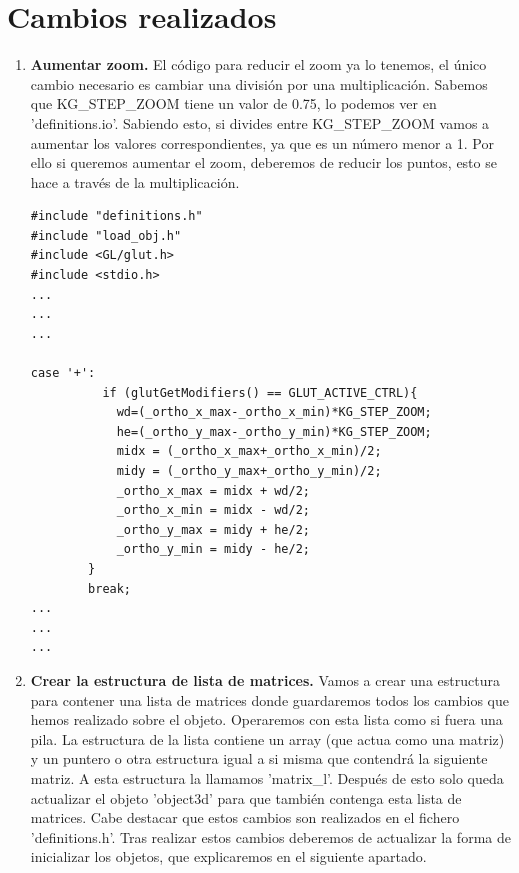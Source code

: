\documentclass[12pt,a4paper]{article}
\begin{document}
\section{Cambios realizados}

\begin{enumerate}
\item \textbf{Aumentar zoom.}\newline
El código para reducir el zoom ya lo tenemos, el único cambio necesario es cambiar una división por una multiplicación. Sabemos que KG\_STEP\_ZOOM tiene un valor de 0.75, lo podemos ver en 'definitions.io'. Sabiendo esto, si divides entre  KG\_STEP\_ZOOM vamos a aumentar los valores correspondientes, ya que es un número menor a 1. Por ello si queremos aumentar el zoom, deberemos de reducir los puntos, esto se hace a través de la multiplicación.
\begin{lstlisting}
#include "definitions.h"
#include "load_obj.h"
#include <GL/glut.h>
#include <stdio.h>
...
...
...

case '+':
          if (glutGetModifiers() == GLUT_ACTIVE_CTRL){
            wd=(_ortho_x_max-_ortho_x_min)*KG_STEP_ZOOM;
            he=(_ortho_y_max-_ortho_y_min)*KG_STEP_ZOOM;
            midx = (_ortho_x_max+_ortho_x_min)/2;
            midy = (_ortho_y_max+_ortho_y_min)/2;
            _ortho_x_max = midx + wd/2;
            _ortho_x_min = midx - wd/2;
            _ortho_y_max = midy + he/2;
            _ortho_y_min = midy - he/2;
        }
        break;
...
...
...
\end{lstlisting}



\item \textbf{Crear la estructura de lista de matrices.}\newline
Vamos a crear una estructura para contener una lista de matrices donde guardaremos todos los cambios que hemos realizado sobre el objeto. Operaremos con esta lista como si fuera una pila.\newline
La estructura de la lista contiene un array (que actua como una matriz) y un puntero o otra estructura igual a si misma que contendrá la siguiente matriz. A esta estructura la llamamos 'matrix\_l'. Después de esto solo queda actualizar el objeto 'object3d' para que también contenga esta lista de matrices. Cabe destacar que estos cambios son realizados en el fichero 'definitions.h'. Tras realizar estos cambios deberemos de actualizar la forma de inicializar los objetos, que explicaremos en el siguiente apartado.


\end{enumerate}
\end{document}
